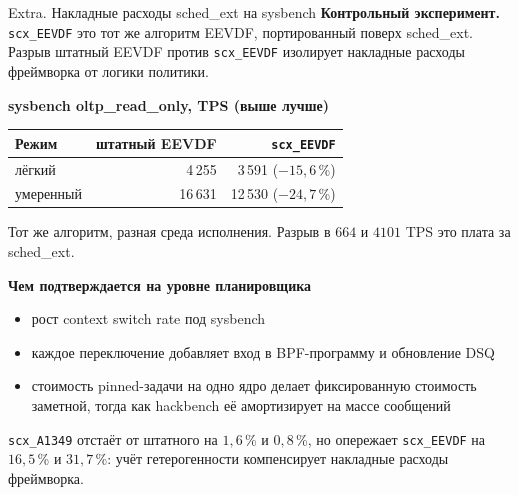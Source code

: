\documentclass[aspectratio=169,11pt]{beamer}
\begin{document}
\begin{frame}{Extra. Накладные расходы sched\_ext на sysbench}
        \footnotesize
        \textbf{Контрольный эксперимент.} \texttt{scx\_EEVDF} это тот
        же алгоритм EEVDF, портированный поверх sched\_ext. Разрыв
        штатный EEVDF против \texttt{scx\_EEVDF} изолирует накладные
        расходы фреймворка от логики политики.

        \vspace{0.15cm}
        \begin{shadowbox}
                \scriptsize
                \textbf{sysbench oltp\_read\_only, TPS (выше лучше)}
                \begin{tabular}{lrr}
                        Режим & штатный EEVDF & \texttt{scx\_EEVDF} \\
                        \hline
                        лёгкий     & 4\,255  & 3\,591  ($-15{,}6$\,\%) \\
                        умеренный  & 16\,631 & 12\,530 ($-24{,}7$\,\%) \\
                \end{tabular}

                \vspace{0.15cm}
                Тот же алгоритм, разная среда исполнения. Разрыв
                в $664$ и $4101$ TPS это плата за sched\_ext.
        \end{shadowbox}

        \vspace{0.15cm}
        \textbf{Чем подтверждается на уровне планировщика}
        \begin{itemize}\setlength{\itemsep}{0pt}
                \item рост context switch rate под sysbench
                \item каждое переключение добавляет вход в
                        BPF-программу и обновление DSQ
                \item стоимость pinned-задачи на одно ядро делает
                        фиксированную стоимость заметной, тогда как
                        hackbench её амортизирует на массе сообщений
        \end{itemize}

        \vspace{0.1cm}
        \texttt{scx\_A1349} отстаёт от штатного на $1{,}6$\,\% и
        $0{,}8$\,\%, но опережает \texttt{scx\_EEVDF} на $16{,}5$\,\%
        и $31{,}7$\,\%: учёт гетерогенности компенсирует накладные
        расходы фреймворка.
\end{frame}
\addtocounter{framenumber}{-1}
\end{document}
